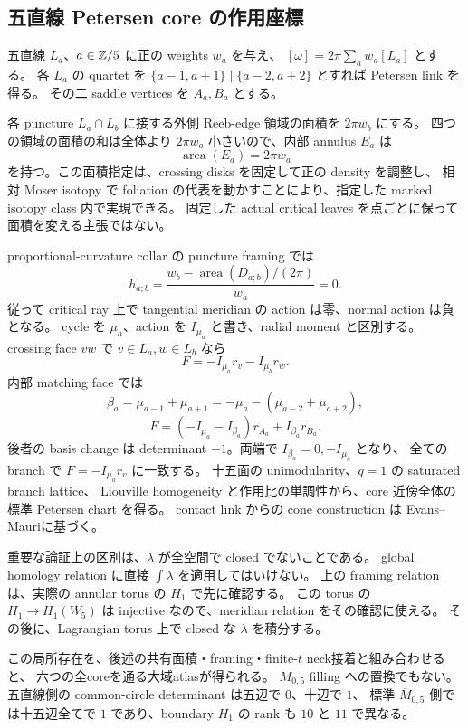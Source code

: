 \documentclass[11pt,a4paper]{article}
\begin{document}
\subsection{五直線 Petersen core の作用座標}

五直線 $L_a$、$a\in\mathbb Z/5$ に正の weights $w_a$ を与え、
$[\omega]=2\pi\sum_aw_a[L_a]$ とする。
各 $L_a$ の quartet を $\{a-1,a+1\}\mid\{a-2,a+2\}$ とすれば Petersen link を得る。
その二 saddle vertices を $A_a,B_a$ とする。

各 puncture $L_a\cap L_b$ に接する外側 Reeb-edge 領域の面積を $2\pi w_b$ にする。
四つの領域の面積の和は全体より $2\pi w_a$ 小さいので、内部 annulus $E_a$ は
\[
 \operatorname{area}(E_a)=2\pi w_a
\]
を持つ。この面積指定は、crossing disks を固定して正の density を調整し、
相対 Moser isotopy で foliation の代表を動かすことにより、指定した marked isotopy class 内で実現できる。
固定した actual critical leaves を点ごとに保って面積を変える主張ではない。

proportional-curvature collar の puncture framing では
\[
 h_{a;b}=\frac{w_b-\operatorname{area}(D_{a;b})/(2\pi)}{w_a}=0.
\]
従って critical ray 上で tangential meridian の action は零、normal action は負となる。
cycle を $\mu_a$、action を $I_{\mu_a}$ と書き、radial moment と区別する。
crossing face $vw$ で $v\in L_a,w\in L_b$ なら
\[
 F=-I_{\mu_a}r_v-I_{\mu_b}r_w.
\]
内部 matching face では
\[
 \beta_a=\mu_{a-1}+\mu_{a+1}
       =-\mu_a-(\mu_{a-2}+\mu_{a+2}),
\]
\[
 F=(-I_{\mu_a}-I_{\beta_a})r_{A_a}+I_{\beta_a}r_{B_a}.
\]
後者の basis change は determinant $-1$。両端で $I_{\beta_a}=0,-I_{\mu_a}$ となり、
全ての branch で $F=-I_{\mu_a}r_v$ に一致する。
十五面の unimodularity、$q=1$ の saturated branch lattice、
Liouville homogeneity と作用比の単調性から、core 近傍全体の標準 Petersen chart を得る。
contact link からの cone construction は Evans--Mauri\cite{EM}に基づく。

重要な論証上の区別は、$\lambda$ が全空間で closed でないことである。
global homology relation に直接 $\int\lambda$ を適用してはいけない。
上の framing relation は、実際の annular torus の $H_1$ で先に確認する。
この torus の $H_1\to H_1(W_5)$ は injective なので、meridian relation をその確認に使える。
その後に、Lagrangian torus 上で closed な $\lambda$ を積分する。

この局所存在を、後述の共有面積・framing・finite-$t$ neck接着と組み合わせると、
六つの全coreを通る大域atlasが得られる。
$M_{0,5}$ filling への置換でもない。五直線側の common-circle determinant は五辺で $0$、十辺で $1$、
標準 $\overline M_{0,5}$ 側では十五辺全てで $1$ であり、boundary $H_1$ の rank も $10$ と $11$ で異なる。
\end{document}

